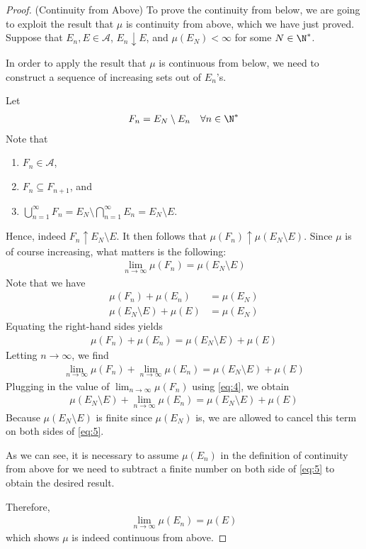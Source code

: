 \documentclass[thmcnt=section, 12pt, color=purple]{my-elegantbook}
\begin{document}
\begin{proof}
	(Continuity from Above)
	To prove the continuity from below,
	we are going to exploit the result that $\mu$
	is continuity from above, which we have just proved.
	Suppose that $E_n, E \in \mathcal{A}$, $E_n \downarrow E$,
	and $\mu(E_N) < \infty$ for some $N \in \N^\ast$.
	\begin{note}
		In order to apply the result that $\mu$
		is continuous from below,
		we need to construct
		a sequence of increasing sets out of $E_n$'s.
	\end{note}
	\noindent Let
	\begin{align*}
		F_n = E_N \setminus E_n
		\quad
		\forall n \in \N^\ast
	\end{align*}
	Note that
	\begin{enumerate}
		\item $F_n \in \mathcal{A}$,
		\item $F_n \subseteq F_{n+1}$, and 
		\item $\bigcup_{n=1}^\infty F_n = E_N \setminus \bigcap_{n=1}^\infty E_n = E_N \setminus E$.
	\end{enumerate}
	Hence, indeed $F_n \uparrow E_N \setminus E$.
	It then follows that $\mu(F_n) \uparrow \mu(E_N \setminus E)$.
	Since $\mu$ is of course increasing, 
	what matters is the following: 
	\begin{align}
		\lim_{n \to \infty} \mu(F_n) = \mu(E_N \setminus E)
		\label{eq:4}
	\end{align}
	Note that we have 
	\begin{align*}
		\mu(F_n) + \mu(E_n) &= \mu(E_N) \\
		\mu(E_N \setminus E) + \mu(E) &= \mu(E_N)
	\end{align*}
	Equating the right-hand sides yields
	\begin{align*}
		\mu(F_n) + \mu(E_n) 
		= \mu(E_N \setminus E) + \mu(E)
	\end{align*}
	Letting $n \to \infty$, we find 
	\begin{align*}
		\lim_{n \to \infty} \mu(F_n) + \lim_{n \to \infty} \mu(E_n) 
		= \mu(E_N \setminus E) + \mu(E)
	\end{align*}
	Plugging in the value of $\lim_{n \to \infty} \mu(F_n)$
	using \eqref{eq:4}, we obtain
	\begin{align}
		\mu(E_N \setminus E) + \lim_{n \to \infty} \mu(E_n) 
		= \mu(E_N \setminus E) + \mu(E)
		\label{eq:5}
	\end{align}
	Because $\mu(E_N \setminus E)$ is finite since $\mu(E_N)$ is,
	we are allowed to cancel this term on both sides of \eqref{eq:5}.
	\begin{note}
		As we can see, it is necessary to assume $\mu(E_n)$
		in the definition of continuity from above
		for we need to subtract a finite number on 
		both side of \eqref{eq:5}
		to obtain the desired result.
	\end{note}
	\noindent Therefore, 
	\begin{align*}
		\lim_{n \to \infty} \mu(E_n) 
		= \mu(E)
	\end{align*}
	which shows $\mu$ is indeed continuous from above.
\end{proof}
\end{document}

